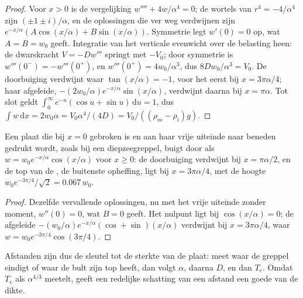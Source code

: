 \begin{proof}
Voor $x > 0$ is de vergelijking $w'''' + 4w/\alpha^4 = 0$; de wortels van
$r^4 = -4/\alpha^4$ zijn $(\pm1 \pm i)/\alpha$, en de oplossingen die ver weg verdwijnen
zijn $e^{-x/\alpha}(A\cos(x/\alpha) + B\sin(x/\alpha))$. Symmetrie legt
$w'(0) = 0$ op, wat $A = B = w_0$ geeft. Integratie van het verticale evenwicht over
de belasting heen: de dwarskracht $V = -Dw'''$ springt met $-V_0$; door symmetrie
is $w'''(0^-) = -w'''(0^+)$, en $w'''(0^+) = 4w_0/\alpha^3$, dus $8Dw_0/\alpha^3 =
V_0$. De doorbuiging verdwijnt waar $\tan(x/\alpha) =
-1$, voor het eerst bij $x = 3\pi\alpha/4$; haar afgeleide,
$-(2w_0/\alpha)e^{-x/\alpha}\sin(x/\alpha)$, verdwijnt daarna bij $x = \pi\alpha$.
Tot slot geldt $\int_0^\infty e^{-u}(\cos u + \sin u)\,\mathrm du = 1$, dus
$\int w\,\mathrm dx = 2w_0\alpha = V_0\alpha^4/(4D) = V_0/((\rho_m - \rho_i)g)$.
\end{proof}

\begin{proposition}\label{prop:b3:gravity-geodesy:broken}
Een plaat die bij $x = 0$ gebroken is en aan haar vrije uiteinde naar beneden gedrukt wordt, zoals bij een diepzeegreppel,
buigt door als $w = w_0e^{-x/\alpha}\cos(x/\alpha)$ voor $x \ge 0$: de
doorbuiging verdwijnt bij $x = \pi\alpha/2$, en de top van de , de buitenste opheffing,
ligt bij $x = 3\pi\alpha/4$, met de hoogte $w_0e^{-3\pi/4}/\sqrt2 =
\num{0.067}\,w_0$.
\end{proposition}

\begin{proof}
Dezelfde vervallende oplossingen, nu met het vrije uiteinde zonder moment,
$w''(0) = 0$, wat $B = 0$ geeft. Het nulpunt ligt bij $\cos(x/\alpha) = 0$; de
afgeleide $-(w_0/\alpha)e^{-x/\alpha}(\cos + \sin)(x/\alpha)$ verdwijnt bij
$x = 3\pi\alpha/4$, waar $w = w_0e^{-3\pi/4}\cos(3\pi/4)$.
\end{proof}

Afstanden zijn dus de sleutel tot de sterkte van de plaat: meet waar de greppel
eindigt of waar de bult zijn top heeft, dan volgt $\alpha$, daarna $D$, en dan $T_e$.
Omdat $T_e$ als $\alpha^{4/3}$ meetelt, geeft een redelijke schatting van een afstand een goede
van de dikte.

